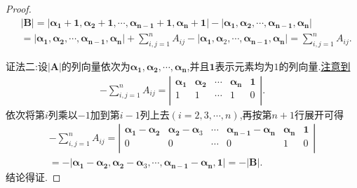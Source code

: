 \documentclass[../../main.tex]{subfiles}%
\begin{document}
\begin{proof}
\begin{align*}
&|\boldsymbol{B}| = |\boldsymbol{\alpha}_{\boldsymbol{1}} + \mathbf{1},\boldsymbol{\alpha}_{\boldsymbol{2}} + \mathbf{1},\cdots,\boldsymbol{\alpha}_{\boldsymbol{n-1}} + \mathbf{1},\boldsymbol{\alpha}_{\boldsymbol{n}} + \mathbf{1}| - |\boldsymbol{\alpha}_{\boldsymbol{1}},\boldsymbol{\alpha}_{\boldsymbol{2}},\cdots,\boldsymbol{\alpha}_{\boldsymbol{n-1}},\boldsymbol{\alpha}_{\boldsymbol{n}}|
\\
&= |\boldsymbol{\alpha}_{\boldsymbol{1}},\boldsymbol{\alpha}_{\boldsymbol{2}},\cdots,\boldsymbol{\alpha}_{\boldsymbol{n-1}},\boldsymbol{\alpha}_{\boldsymbol{n}}| + \sum_{i,j = 1}^{n}A_{ij} - |\boldsymbol{\alpha}_{\boldsymbol{1}},\boldsymbol{\alpha}_2,\cdots,\boldsymbol{\alpha}_{\boldsymbol{n-1}},\boldsymbol{\alpha}_{\boldsymbol{n}}| = \sum_{i,j = 1}^{n}A_{ij}.
\end{align*}

{\color{blue}证法二:}设\(|\boldsymbol{A}|\)的列向量依次为\(\boldsymbol{\alpha}_{\boldsymbol{1}},\boldsymbol{\alpha}_{\boldsymbol{2}},\cdots,\boldsymbol{\alpha}_{\boldsymbol{n}}\),并且\(\mathbf{1}\)表示元素均为\(1\)的列向量.\hyperref[关于行列式|A|所有代数余子式求和的构造]{注意到}
\begin{align*}
-\sum_{i,j=1}^n{A_{ij}}=\left| \begin{matrix}
\boldsymbol{\alpha }_{\mathbf{1}}&		\boldsymbol{\alpha }_{\mathbf{2}}&		\cdots&		\boldsymbol{\alpha }_{\boldsymbol{n}}&		\mathbf{1}\\
1&		1&		\cdots&		1&		0\\
\end{matrix} \right|.
\end{align*}
依次将第$i$列乘以$-1$加到第$i-1$列上去$(i=2,3,\cdots,n)$,再按第$n+1$行展开可得
\begin{align*}
-\sum_{i,j=1}^n{A_{ij}=\left| \begin{matrix}
\boldsymbol{\alpha }_{\mathbf{1}}-\boldsymbol{\alpha }_{\mathbf{2}}&		\boldsymbol{\alpha }_{\mathbf{2}}-\boldsymbol{\alpha }_{3}&		\cdots&		\boldsymbol{\alpha }_{\boldsymbol{n}-\mathbf{1}}-\boldsymbol{\alpha }_{\boldsymbol{n}}&		\boldsymbol{\alpha }_{\boldsymbol{n}}&		\mathbf{1}\\
0&		0&		\cdots&		0&		1&		0\\
\end{matrix} \right|}
\\
=-|\boldsymbol{\alpha }_{\mathbf{1}}-\boldsymbol{\alpha }_{\mathbf{2}},\boldsymbol{\alpha }_{\mathbf{2}}-\boldsymbol{\alpha }_{3},\cdots ,\boldsymbol{\alpha }_{\boldsymbol{n}-\mathbf{1}}-\boldsymbol{\alpha }_{\boldsymbol{n}},\mathbf{1}|=-|\boldsymbol{B}|.
\end{align*}
结论得证.
\end{proof}
\end{document}
